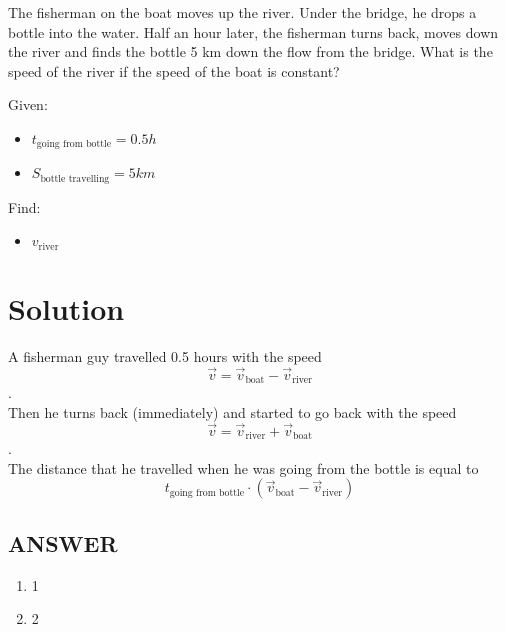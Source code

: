 The fisherman on the boat moves up the river. Under the bridge, he drops a bottle into the water.
Half an hour later, the fisherman turns back, moves down the river and finds the bottle 5 km
down the flow from the bridge. What is the speed of the river if the speed of the boat is constant?

\bigbreak Given: \begin{itemize}
    \item $t_{\text{going from bottle}} = 0.5h$
    \item $S_{\text{bottle travelling}} = 5km$
\end{itemize}

Find: \begin{itemize}
    \item $v_{\text{river}}$
\end{itemize}

\section*{Solution}

A fisherman guy travelled 0.5 hours with the speed $$\Vec{v} = \Vec{v}_{\text{boat}} - \Vec{v}_{\text{river}}$$.
\\ Then he turns back (immediately) and started to go back with the speed $$\Vec{v} = \Vec{v}_{\text{river}} + \Vec{v}_{\text{boat}}$$.
\\ The distance that he travelled when he was going from the bottle is equal to $$t_{\text{going from bottle}} \cdot (\Vec{v}_{\text{boat}} - \Vec{v}_{\text{river}})$$



\vfill
\subsection*{ANSWER}
\begin{enumerate}
    \item 1
    \item 2
\end{enumerate}

